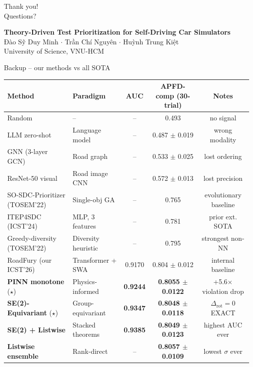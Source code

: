 \documentclass[aspectratio=169,10pt]{beamer}
\begin{document}
\begin{frame}[standout]
\centering
\vspace{0.8em}
\Huge Thank you!\\[0.5em]
\Large \textcolor{accent}{Questions?}

\vspace{1.5em}
\normalsize
\textbf{Theory-Driven Test Prioritization for Self-Driving Car Simulators}\\[0.3em]
\footnotesize
Đào Sỹ Duy Minh \quad $\cdot$ \quad Trần Chí Nguyên \quad $\cdot$ \quad Huỳnh Trung Kiệt\\
University of Science, VNU-HCM
\end{frame}

\appendix

\begin{frame}{Backup -- our methods vs all SOTA}
\centering\tiny
\begin{tabular}{l l c c c}
  \toprule
  \textbf{Method} & \textbf{Paradigm} & \textbf{AUC} & \textbf{APFD-comp (30-trial)} & \textbf{Notes} \\
  \midrule
  Random                        & --                  & --      & 0.493              & no signal \\
  LLM zero-shot                 & Language model      & --      & 0.487 $\pm$ 0.019  & wrong modality \\
  GNN (3-layer GCN)             & Road graph          & --      & 0.533 $\pm$ 0.025  & lost ordering \\
  ResNet-50 visual              & Road image CNN      & --      & 0.572 $\pm$ 0.013  & lost precision \\
  SO-SDC-Prioritizer (TOSEM'22) & Single-obj GA       & --      & 0.765              & evolutionary baseline \\
  ITEP4SDC (ICST'24)            & MLP, 3 features     & --      & 0.781              & prior ext. SOTA \\
  Greedy-diversity (TOSEM'22)   & Diversity heuristic & --      & 0.795              & strongest non-NN \\
  RoadFury (our ICST'26)        & Transformer + SWA   & 0.9170  & 0.804 $\pm$ 0.012  & internal baseline \\
  \midrule
  \rowcolor{accent!10}
  \textbf{PINN monotone} ($\star$) & Physics-informed    & \textbf{0.9244} & \textbf{0.8055 $\pm$ 0.0122} & +5.6$\times$ violation drop \\
  \rowcolor{accent!10}
  \textbf{SE(2)-Equivariant} ($\star$) & Group-equivariant & \textbf{0.9347} & \textbf{0.8048 $\pm$ 0.0118} & $\Delta_{\text{rot}}=0$ EXACT \\
  \rowcolor{accent!15}
  \textbf{SE(2) + Listwise}     & Stacked theorems    & \textbf{0.9385} & \textbf{0.8049 $\pm$ 0.0123} & highest AUC ever \\
  \rowcolor{accent!15}
  \textbf{Listwise ensemble}    & Rank-direct         & --      & \textbf{0.8057 $\pm$ 0.0109} & lowest $\sigma$ ever \\
  \bottomrule
\end{tabular}


\end{frame}
\end{document}
